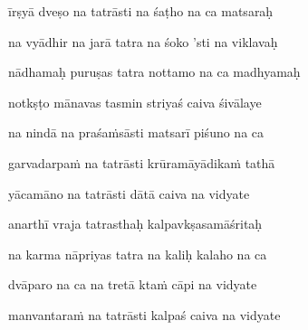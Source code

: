 īrṣyā dveṣo na tatrāsti na śaṭho na ca matsaraḥ \veg\dontdisplaylinenum
{}

na vyādhir na jarā tatra na śoko 'sti na viklavaḥ\thinspace{\dandab} \dontdisplaylinenum
{}

nādhamaḥ puruṣas tatra nottamo na ca madhyamaḥ \veg\dontdisplaylinenum

notkṣṭo mānavas tasmin striyaś caiva śivālaye\thinspace{\dandab} \dontdisplaylinenum
{}

na nindā na praśaṁsāsti matsarī piśuno na ca \veg\dontdisplaylinenum
{}

garvadarpaṁ na tatrāsti krūramāyādikaṁ tathā\thinspace{\dandab} \dontdisplaylinenum

yācamāno na tatrāsti dātā caiva na vidyate \veg\dontdisplaylinenum
{}

anarthī vraja tatrasthaḥ kalpavkṣasamāśritaḥ\thinspace{\dandab} \dontdisplaylinenum
{}

na karma nāpriyas tatra na kaliḥ kalaho na ca \veg\dontdisplaylinenum
{}

dvāparo na ca na tretā ktaṁ cāpi na vidyate\thinspace{\dandab} \dontdisplaylinenum
{}

manvantaraṁ na tatrāsti kalpaś caiva na vidyate \veg\dontdisplaylinenum
{}

